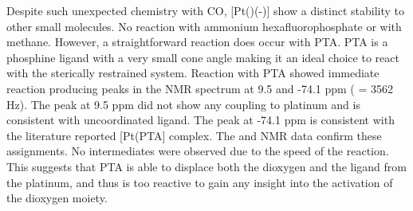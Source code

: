 Despite such unexpected chemistry with CO, [Pt(\tButhixantphos)(\hapto{}-)] show a distinct stability to other small molecules.  No reaction with ammonium hexafluorophosphate or with methane.  However, a straightforward reaction does occur with PTA.  PTA is a phosphine ligand with a very small cone angle making it an ideal choice to react with the sterically restrained system.  Reaction with PTA showed immediate reaction producing peaks in the \phosphorus{} NMR spectrum at 9.5 and -74.1 ppm (\JPtP{} = 3562 Hz).  The peak at 9.5 ppm did not show any coupling to platinum and is consistent with uncoordinated \tButhixantphos{} ligand.  The peak at -74.1 ppm is consistent with the literature reported [Pt(PTA] complex.  The \proton{} and \carbon{} NMR data confirm these assignments.  No intermediates were observed due to the speed of the reaction.  This suggests that PTA is able to displace both the dioxygen and the \tButhixantphos{} ligand from the platinum, and thus is too reactive to gain any insight into the activation of the dioxygen moiety.  
%
%
%
%
%  
